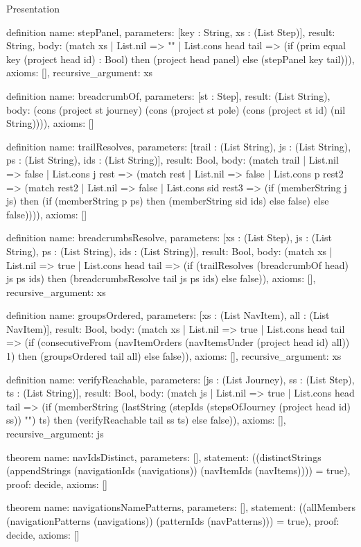 \begin{lexlean}{Presentation}
\begin{semanticmodule}
definition{
  name: stepPanel,
  parameters: [key : String, xs : (List Step)],
  result: String,
  body: (match xs
    | List.nil => ""
    | List.cons head tail => (if (prim equal key (project head id) : Bool) then (project head panel) else (stepPanel key tail))),
  axioms: [],
  recursive_argument: xs
}

definition{
  name: breadcrumbOf,
  parameters: [st : Step],
  result: (List String),
  body: (cons (project st journey) (cons (project st pole) (cons (project st id) (nil String)))),
  axioms: []
}

definition{
  name: trailResolves,
  parameters: [trail : (List String), js : (List String), ps : (List String), ids : (List String)],
  result: Bool,
  body: (match trail
    | List.nil => false
    | List.cons j rest => (match rest
    | List.nil => false
    | List.cons p rest2 => (match rest2
    | List.nil => false
    | List.cons sid rest3 => (if (memberString j js) then (if (memberString p ps) then (memberString sid ids) else false) else false)))),
  axioms: []
}

definition{
  name: breadcrumbsResolve,
  parameters: [xs : (List Step), js : (List String), ps : (List String), ids : (List String)],
  result: Bool,
  body: (match xs
    | List.nil => true
    | List.cons head tail => (if (trailResolves (breadcrumbOf head) js ps ids) then (breadcrumbsResolve tail js ps ids) else false)),
  axioms: [],
  recursive_argument: xs
}

definition{
  name: groupsOrdered,
  parameters: [xs : (List NavItem), all : (List NavItem)],
  result: Bool,
  body: (match xs
    | List.nil => true
    | List.cons head tail => (if (consecutiveFrom (navItemOrders (navItemsUnder (project head id) all)) 1) then (groupsOrdered tail all) else false)),
  axioms: [],
  recursive_argument: xs
}

definition{
  name: verifyReachable,
  parameters: [js : (List Journey), ss : (List Step), ts : (List String)],
  result: Bool,
  body: (match js
    | List.nil => true
    | List.cons head tail => (if (memberString (lastString (stepIds (stepsOfJourney (project head id) ss)) "") ts) then (verifyReachable tail ss ts) else false)),
  axioms: [],
  recursive_argument: js
}

theorem{
  name: navIdsDistinct,
  parameters: [],
  statement: ((distinctStrings (appendStrings (navigationIds (navigations)) (navItemIds (navItems)))) = true),
  proof: decide{},
  axioms: []
}

theorem{
  name: navigationsNamePatterns,
  parameters: [],
  statement: ((allMembers (navigationPatterns (navigations)) (patternIds (navPatterns))) = true),
  proof: decide{},
  axioms: []
}


\end{semanticmodule}
\end{lexlean}
